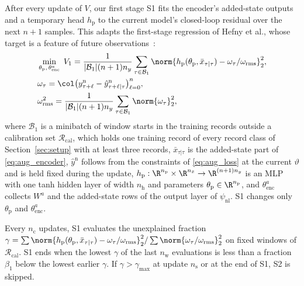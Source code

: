 After every update of $V$, our first stage S1 fits the encoder's added-state
outputs and a temporary head $h_{\mathrm p}$ to the current model's closed-loop
residual over the next $n+1$ samples.
This adapts the first-stage regression of Hefny et al., whose target is a
feature of future observations~\cite[Sec.~2]{hefny2015supervised}:
{\small
\begin{equation}
\begin{aligned}
 &\min_{\theta_{\mathrm p},\,\theta^a_{\mathrm{enc}}}\;
  V_1=\frac{1}{|\mathcal B_1|(n+1)n_y}\sum_{\tau\in\mathcal B_1}
  \norm{h_{\mathrm p}(\theta_{\mathrm p},\bar x_{\tau|\tau})
   -\omega_\tau/\omega_{\mathrm{rms}}}_2^2,\\
 &\omega_\tau=\col\bigl(y^{\mathrm n}_{\tau+\ell}
   -\hat y^{\mathrm n}_{\tau+\ell|\tau}\bigr)_{\ell=0}^{n},\\
 &\omega_{\mathrm{rms}}^2=\frac{1}{|\mathcal B_1|(n+1)n_y}
  \sum_{\tau\in\mathcal B_1}\norm{\omega_\tau}_2^2,
\end{aligned}
\label{eq:ps2_s1}
\end{equation}
}
where $\mathcal B_1$ is a minibatch of window starts in the training records
outside a calibration set $\mathcal R_{\mathrm{cal}}$, which holds one training
record of every record class of Section~\ref{sec:setup} with at least three
records, $\bar x_{\tau|\tau}$ is the added-state part of \eqref{eq:aug_encoder},
$\hat y^{\mathrm n}$ follows from the constraints of \eqref{eq:aug_loss} at the
current $\vartheta$ and is held fixed during the update,
$h_{\mathrm p}:\R^{n_{\mathrm p}}\times\R^{n_{\bar x}}\to\R^{(n+1)n_y}$ is an
MLP with one tanh hidden layer of width $n_{\mathrm h}$ and
parameters $\theta_{\mathrm p}\in\R^{n_{\mathrm p}}$, and
$\theta^a_{\mathrm{enc}}$ collects $W^a$ and the added-state rows of the output
layer of $\psi_{\mathrm{nl}}$.
S1 changes only $\theta_{\mathrm p}$ and $\theta^a_{\mathrm{enc}}$.

Every $n_{\mathrm c}$ updates, S1 evaluates the unexplained fraction
$\gamma=\sum\norm{h_{\mathrm p}(\theta_{\mathrm p},\bar x_{\tau|\tau})-\omega_\tau/\omega_{\mathrm{rms}}}_2^2/\sum\norm{\omega_\tau/\omega_{\mathrm{rms}}}_2^2$
on fixed windows of $\mathcal R_{\mathrm{cal}}$.
S1 ends when the lowest $\gamma$ of the last $n_{\mathrm w}$ evaluations is less
than a fraction $\beta_1$ below the lowest earlier $\gamma$.
If $\gamma>\gamma_{\max}$ at update $n_{\mathrm s}$ or at the end of S1, S2 is
skipped.

